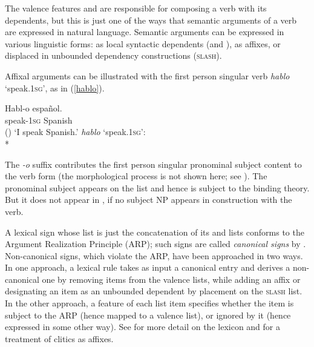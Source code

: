 \documentclass[output=paper
 	        ,biblatex
                ,babelshorthands
                ,newtxmath
                ,draftmode
                ,colorlinks, citecolor=brown
]{langscibook}
\begin{document}
The valence features \subj and \comps are responsible for composing a verb with its dependents, but
this is just one of the ways that semantic arguments of a verb are expressed in natural language.
Semantic arguments can be expressed in various linguistic forms: as local syntactic dependents
(\subj and \comps), as affixes, or displaced in unbounded dependency constructions (\textsc{slash}).

Affixal arguments can be illustrated with the first person singular  verb
\textit{hablo} `speak.\textsc{1sg}', as in (\ref{hablo}).


\begin{exe} 
\ex	
\label{hablo}
\begin{xlist}
\ex
\gll Habl-o espa\~{n}ol.  \\
     speak-\textsc{1sg} Spanish  \\\hfill()
\glt `I speak Spanish.'
\ex \textit{hablo} `speak.\textsc{1sg}': \\*
\end{xlist}
\end{exe}

\noindent
The \textit{-o} suffix contributes the first person singular pronominal subject content to the verb
form (the morphological process is not shown here; see ).  The
pronominal subject appears on the \argst list and hence is subject to the binding theory.  But it
does not appear in \subj, if no subject NP appears in construction with the verb.

A lexical sign whose \argst list is just the concatenation of its \subj{} and \comps{} lists conforms to
the Argument Realization Principle (ARP); such signs are called
\emph{canonical signs} by \citet{Boumaetal2001}.  Non-canonical signs, which
violate the ARP, have been approached in two ways.  In one approach, a lexical rule takes as input a
canonical entry and derives a non-canonical one by removing items from the valence lists, while
adding an affix or designating an item as an unbounded dependent by placement on the \textsc{slash}
list. In the other
approach, a feature of each \argst list item specifies whether the item is subject to the ARP (hence
mapped to a valence list), or ignored by it (hence expressed in some other way).  See
   for more detail on the lexicon and \citet{MillerandSag1997} for a
  treatment of  clitics as affixes.
\end{document}
